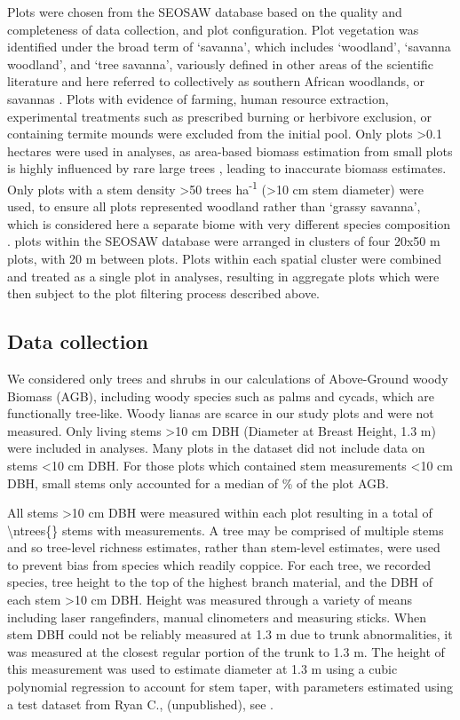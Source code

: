 \begin{refsection}
Plots were chosen from the SEOSAW database based on the quality and completeness of data collection, and plot configuration. Plot vegetation was identified under the broad term of `savanna', which includes `woodland', `savanna woodland', and `tree savanna', variously defined in other areas of the scientific literature and here referred to collectively as southern African woodlands, or savannas \citep{Ratnam2011, Hill2010}. Plots with evidence of farming, human resource extraction, experimental treatments such as prescribed burning or herbivore exclusion, or containing termite mounds were excluded from the initial pool. Only plots >0.1 hectares were used in analyses, as area-based biomass estimation from small plots is highly influenced by rare large trees \citep{Stegen2011}, leading to inaccurate biomass estimates. Only plots with a stem density >50 trees ha\textsuperscript{-1} (>10 cm stem diameter) were used, to ensure all plots represented woodland rather than `grassy savanna', which is considered here a separate biome with very different species composition \citep{Parr2014}. \nzam{} plots within the SEOSAW database were arranged in clusters of four 20x50 m plots, with 20 m between plots. Plots within each spatial cluster were combined and treated as a single plot in analyses, resulting in \nzamcluster{} aggregate plots which were then subject to the plot filtering process described above.

\subsection{Data collection}
\label{befr:ssec:data}
 
We considered only trees and shrubs in our calculations of Above-Ground woody Biomass (AGB), including woody species such as palms and cycads, which are functionally tree-like. Woody lianas are scarce in our study plots and were not measured. Only living stems >10 cm DBH (Diameter at Breast Height, 1.3 m) were included in analyses. Many plots in the dataset did not include data on stems <10 cm DBH. For those plots which contained stem measurements <10 cm DBH, small stems only accounted for a median of \percsmallagb{}\% of the plot AGB. 

All stems >10 cm DBH were measured within each plot resulting in a total of \num[group-separator={,}]{\ntrees{}} stems with measurements. A tree may be comprised of multiple stems and so tree-level richness estimates, rather than stem-level estimates, were used to prevent bias from species which readily coppice. For each tree, we recorded species, tree height to the top of the highest branch material, and the DBH of each stem >10 cm DBH. Height was measured through a variety of means including laser rangefinders, manual clinometers and measuring sticks. When stem DBH could not be reliably measured at 1.3 m due to trunk abnormalities, it was measured at the closest regular portion of the trunk to 1.3 m. The height of this measurement was used to estimate diameter at 1.3 m using a cubic polynomial regression to account for stem taper, with parameters estimated using a test dataset from Ryan C., (unpublished), see \citet{Godlee2020}. 


\end{refsection}

